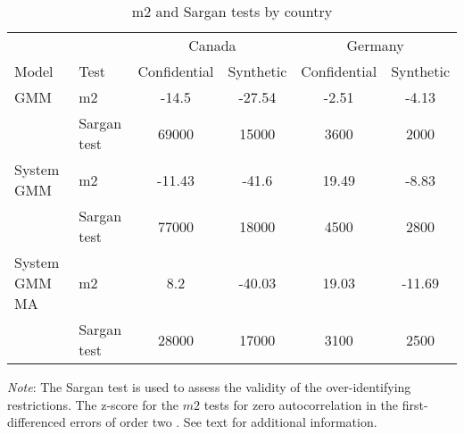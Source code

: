 
\begin{table}[!htbp] \centering 
  \caption{m2 and Sargan tests by country} 
  \label{tab:m2sargan} 
\begin{tabular}{@{\extracolsep{5pt}} llcccc} 
\\[-1.8ex]
\toprule
      &      &\multicolumn{2}{c}{Canada}&\multicolumn{2}{c}{Germany}\\
Model & Test & Confidential & Synthetic & Confidential & Synthetic \\ 
\toprule
GMM & m2 & -14.5 & -27.54 & -2.51 & -4.13 \\ 
    & Sargan test & 69000 & 15000 & 3600 & 2000 \\ 
    \midrule
System GMM & m2 & -11.43 & -41.6 & 19.49 & -8.83 \\ 
           & Sargan test & 77000 & 18000 & 4500 & 2800 \\ 
           \midrule
System GMM MA & m2 & 8.2 & -40.03 & 19.03 & -11.69 \\ 
              & Sargan test & 28000 & 17000 & 3100 & 2500 \\ 
\bottomrule
\end{tabular} 
\begin{tablenotes}\small \item 
\textit{Note}: The Sargan test \parencite{blundell_estimation_2001,RePEc:oup:restud:v:58:y:1991:i:2:p:277-297.} is used to assess the validity of the over-identifying restrictions. The z-score for the $m2$ tests for zero autocorrelation in the  first-differenced errors of order two \parencite{RePEc:oup:restud:v:58:y:1991:i:2:p:277-297.}. See text for additional information.
\end{tablenotes}
\end{table} 
